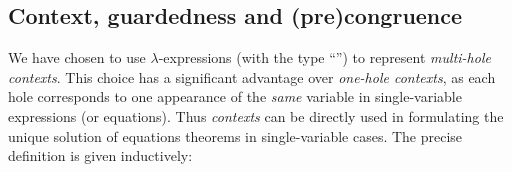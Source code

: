 
\subsection{Context, guardedness and (pre)congruence}
\label{ss:context}


We have chosen to use $\lambda$-expressions (with the type
``'')
to represent \emph{multi-hole contexts}.
%
This choice has a significant advantage over \emph{one-hole
contexts}, as each hole corresponds to one
appearance of the \emph{same} variable in single-variable
expressions (or equations). Thus \emph{contexts} can be directly used in
formulating the unique solution of equations theorems in
single-variable cases. The precise definition is given inductively:
